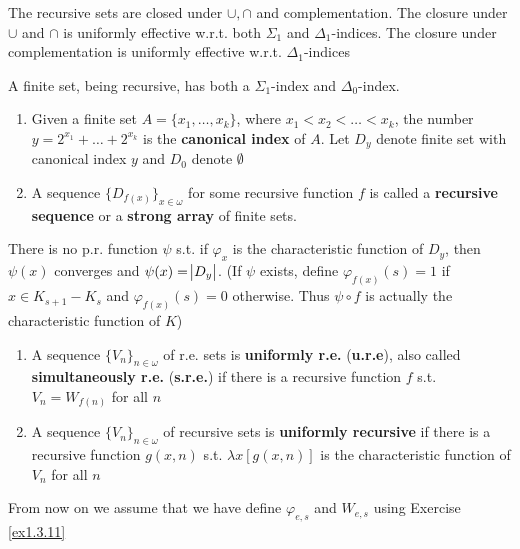 \documentclass[11pt]{article}
\begin{document}
\begin{corollary}[]
\label{cor2.2.3}
The recursive sets are closed under \(\cup,\cap\) and complementation. The
closure under \(\cup\) and \(\cap\) is uniformly effective w.r.t. both
\(\Sigma_1\) and \(\Delta_1\)-indices. The closure under complementation is
uniformly effective w.r.t. \(\Delta_1\)-indices
\end{corollary}

A finite set, being recursive, has both a \(\Sigma_1\)-index and
\(\Delta_0\)-index.

\begin{definition}[]
\begin{enumerate}
\item Given a finite set \(A=\{x_1,\dots,x_k\}\), where \(x_1<x_2<\dots<x_k\),
the number \(y=2^{x_1}+\dots+2^{x_k}\) is the \textbf{canonical index} of \(A\).
Let \(D_y\) denote finite set with canonical index \(y\) and \(D_0\)
denote \(\emptyset\)
\item A sequence \(\{D_{f(x)}\}_{x\in\omega}\) for some recursive function \(f\)
is called a \textbf{recursive sequence} or a \textbf{strong array} of finite sets.
\end{enumerate}
\end{definition}

There is no p.r. function \(\psi\) s.t. if \(\varphi_x\) is the characteristic
function of \(D_y\), then \(\psi(x)\) converges and \(\psi(x)=\abs{D_y}\).
(If \(\psi\) exists, define \(\varphi_{f(x)}(s)=1\) if \(x\in K_{s+1}-K_s\) and
\(\varphi_{f(x)}(s)=0\) otherwise. Thus \(\psi\circ f\) is actually the
characteristic function of \(K\))

\begin{definition}[]
\begin{enumerate}
\item A sequence \(\{V_n\}_{n\in\omega}\) of r.e. sets is \textbf{uniformly r.e.}
(\textbf{u.r.e}), also called \textbf{simultaneously r.e.} (\textbf{s.r.e.}) if there is a
recursive function \(f\) s.t. \(V_n=W_{f(n)}\) for all \(n\)
\item A sequence \(\{V_n\}_{n\in\omega}\) of recursive sets is \textbf{uniformly
recursive} if there is a recursive function \(g(x,n)\) s.t.
\(\lambda x[g(x,n)]\) is the characteristic function of \(V_n\) for all \(n\)
\end{enumerate}
\end{definition}

From now on we assume that we have define \(\varphi_{e,s}\) and \(W_{e,s}\)
using Exercise \ref{ex1.3.11}
\end{document}
